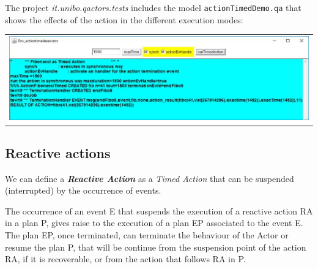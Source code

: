 The project \textit{it.unibo.qactors.tests} includes the model \texttt{actionTimedDemo.qa} that shows the effects of the action in the different execution modes:



  
 
\begin{center}
\begin{tabular}{ c }
     \includegraphics[scale = 0.6]{img/actionTimed.jpg}\\
\end{tabular} 
\end{center}



\newpage 
\subsection{Reactive actions}
We can define a \textit{\textbf{Reactive Action}} as a \textit{Timed Action} that can be suspended (interrupted) by the occurrence of events.  

The occurrence of an event E that suspends the execution of a reactive action RA in a plan P, gives raise to the execution of a plan EP associated to the event E. The plan EP, once terminated, can terminate the behaviour of the Actor or resume the plan P, that will be continue from the suspension point of the action RA, if it is recoverable, or from the action that follows RA in P.


